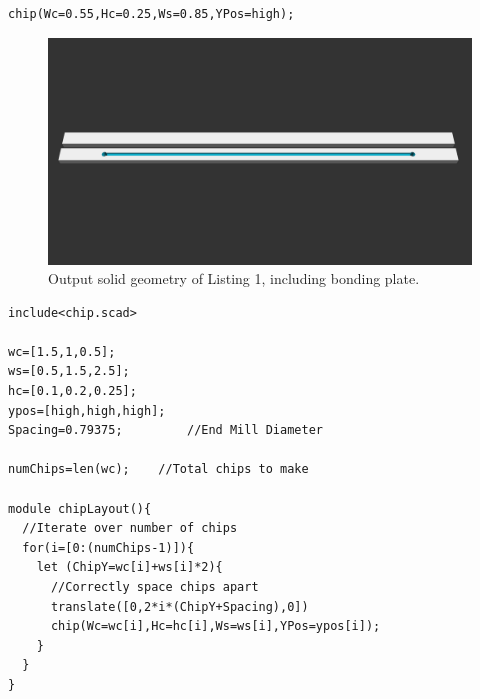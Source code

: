 \begin{minipage}{0.99\linewidth}
\begin{lstlisting}[caption={The custom OpenSCAD library allows solid model creation using just a single line of code},label={lst:chip}, frame=single, language=scad]
  chip(Wc=0.55,Hc=0.25,Ws=0.85,YPos=high);
\end{lstlisting}
\end{minipage}

\begin{figure}[htb]
  \begin{minipage}[t]{0.99\linewidth}\centering
    \includegraphics[width=14cm]{PaperExampleListing1}
  \end{minipage}\hfill
  \caption[Single solid geometry]{Output solid geometry of Listing 1, including bonding plate.}
  \label{fig:listing1}
\end{figure}

\begin{minipage}{0.99\linewidth}
\begin{lstlisting}[caption={The single line of code in Listing \ref{lst:chip} can then be iterated upon to form an array of different device geometries that can be sent directly to a CAM tool for toolpath generation}, label={lst:chipLayout}, frame=single, language=scad]
include<chip.scad>

wc=[1.5,1,0.5];		 
ws=[0.5,1.5,2.5];
hc=[0.1,0.2,0.25];
ypos=[high,high,high];
Spacing=0.79375;         //End Mill Diameter

numChips=len(wc);	 //Total chips to make

module chipLayout(){
  //Iterate over number of chips
  for(i=[0:(numChips-1)]){
    let (ChipY=wc[i]+ws[i]*2){
      //Correctly space chips apart
      translate([0,2*i*(ChipY+Spacing),0])
      chip(Wc=wc[i],Hc=hc[i],Ws=ws[i],YPos=ypos[i]);
    }
  }
}
\end{lstlisting}
\end{minipage}


